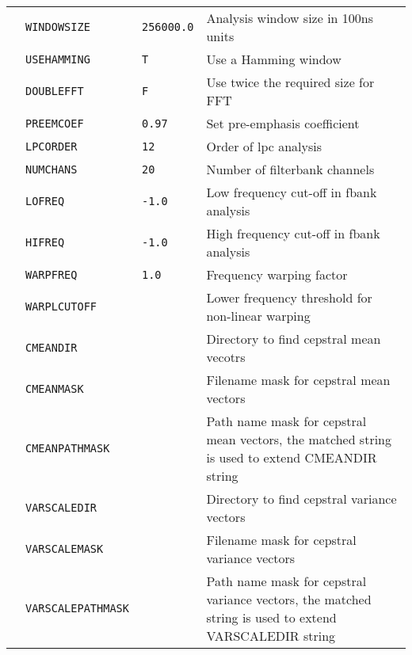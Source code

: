 \begin{center}
\begin{supertabular}{|p{1.8cm}|l|l|p{6.6cm}|}
  & \texttt{WINDOWSIZE} & \texttt{256000.0} & Analysis window size in 100ns units \\ 


  & \texttt{USEHAMMING} & \texttt{T} & Use a Hamming window \\ 


  & \texttt{DOUBLEFFT} & \texttt{F} & Use twice the required size for FFT \\ 


  & \texttt{PREEMCOEF} & \texttt{0.97} & Set pre-emphasis coefficient \\ 


  & \texttt{LPCORDER} &  \texttt{12} &  Order of lpc analysis \\ 


  & \texttt{NUMCHANS} & \texttt{20} & Number of filterbank channels \\ 


  & \texttt{LOFREQ} & \texttt{-1.0} & Low frequency cut-off in fbank analysis \\ 


  & \texttt{HIFREQ}  & \texttt{-1.0} & High frequency cut-off in fbank analysis \\  


  & \texttt{WARPFREQ} & \texttt{1.0} & Frequency warping factor \\ 


  & \texttt{WARPLCUTOFF} &  & Lower frequency threshold for non-linear warping  \\ 


  & \texttt{CMEANDIR} &  & Directory to find cepstral mean vecotrs  \\ 


  & \texttt{CMEANMASK} &  & Filename mask for cepstral mean vectors  \\ 


  & \texttt{CMEANPATHMASK} &  & Path name mask for cepstral mean vectors, the matched string is used to extend CMEANDIR string \\ 


  & \texttt{VARSCALEDIR} &  & Directory to find cepstral variance vectors  \\ 


  & \texttt{VARSCALEMASK} &  & Filename mask for cepstral variance vectors  \\ 


  & \texttt{VARSCALEPATHMASK} &  & Path name mask for cepstral variance vectors, the matched string is used to extend VARSCALEDIR string\\ 



\end{supertabular}
\end{center}
